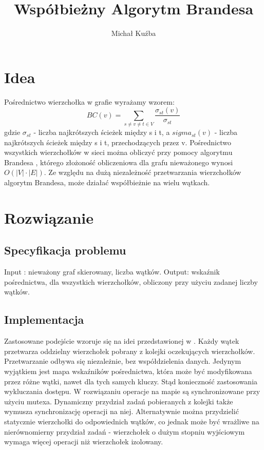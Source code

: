 \documentclass[]{article}
\title{Współbieżny Algorytm Brandesa}
\author{Michał Kuźba}
\begin{document}
\maketitle

\section{Idea}
Pośrednictwo wierzchołka w grafie wyrażamy wzorem:
\[BC(v) = \sum_{s\neq v\neq t \in V}^{} \frac{\sigma_{st}(v)}{\sigma_{st}}\]
gdzie \(\sigma_{st}\) - liczba najkrótszych ścieżek między s i t,
a \(sigma_{st}(v)\) - liczba najkrótszych ścieżek między s i t, przechodzących przez v.
Pośrednictwo wszystkich wierzchołków w sieci można obliczyć przy pomocy algorytmu Brandesa \parencite{brandes:01}, którego złożoność obliczeniowa dla grafu nieważonego wynosi \(O(|V|\cdot|E|)\).
Ze względu na dużą niezależność przetwarzania wierzchołków algorytm Brandesa, może działać współbieżnie na wielu wątkach.

\section{Rozwiązanie}
\subsection{Specyfikacja problemu}
Input : nieważony graf skierowany, liczba wątków.
Output: wskaźnik pośrednictwa, dla wszystkich wierzchołków, obliczony przy użyciu zadanej liczby wątków.
\subsection{Implementacja}
Zastosowane podejście wzoruje się na idei przedstawionej w \parencite[p. 539-550]{bader:06}. Każdy wątek przetwarza oddzielny wierzchołek pobrany z kolejki oczekujących wierzchołków. Przetwarzanie odbywa się niezależnie, bez współdzielenia danych. Jedynym wyjątkiem jest mapa wskaźników pośrednictwa, która może być modyfikowana przez różne wątki, nawet dla tych samych kluczy. Stąd konieczność zastosowania wykluczania dostępu. W rozwiązaniu operacje na mapie są synchronizowane przy użyciu mutexa. Dynamiczny przydział zadań pobieranych z kolejki także wymusza synchronizację operacji na niej. 
Alternatywnie można przydzielić statycznie wierzchołki do odpowiednich wątków, co jednak może być wrażliwe na nierównomierny przydział zadań - wierzchołek o dużym stopniu wyjściowym wymaga więcej operacji niż wierzchołek izolowany.
\end{document}
